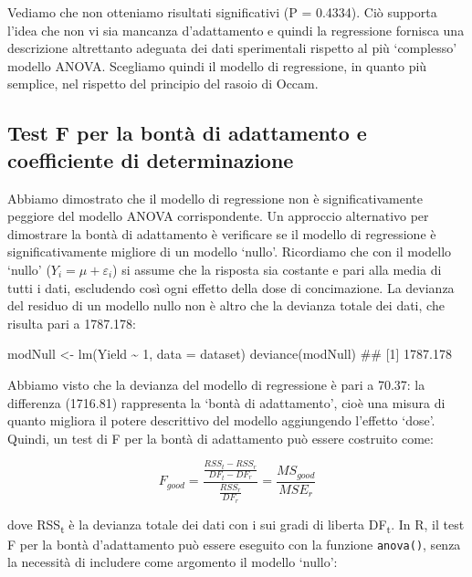 \documentclass[a4paper,12pt,oneside]{book}
\newenvironment{Shaded}{\begin{snugshade}}{\end{snugshade}}
\newcommand{\DecValTok}[1]{#1}
\newcommand{\SpecialCharTok}[1]{#1}
\newcommand{\DocumentationTok}[1]{#1}
\newcommand{\OtherTok}[1]{#1}
\newcommand{\FunctionTok}[1]{#1}
\newcommand{\AttributeTok}[1]{#1}
\newcommand{\NormalTok}[1]{#1}
\begin{document}
Vediamo che non otteniamo risultati significativi (P = 0.4334). Ciò supporta l'idea che non vi sia mancanza d'adattamento e quindi la regressione fornisca una descrizione altrettanto adeguata dei dati sperimentali rispetto al più `complesso' modello ANOVA. Scegliamo quindi il modello di regressione, in quanto più semplice, nel rispetto del principio del rasoio di Occam.

\hypertarget{test-f-per-la-bontuxe0-di-adattamento-e-coefficiente-di-determinazione}{%
\subsection{Test F per la bontà di adattamento e coefficiente di determinazione}\label{test-f-per-la-bontuxe0-di-adattamento-e-coefficiente-di-determinazione}}

Abbiamo dimostrato che il modello di regressione non è significativamente peggiore del modello ANOVA corrispondente. Un approccio alternativo per dimostrare la bontà di adattamento è verificare se il modello di regressione è significativamente migliore di un modello `nullo'. Ricordiamo che con il modello `nullo' (\(Y_i = \mu + \varepsilon_i\)) si assume che la risposta sia costante e pari alla media di tutti i dati, escludendo così ogni effetto della dose di concimazione. La devianza del residuo di un modello nullo non è altro che la devianza totale dei dati, che risulta pari a 1787.178:

\begin{Shaded}
\begin{Highlighting}[]
\NormalTok{modNull }\OtherTok{\textless{}{-}} \FunctionTok{lm}\NormalTok{(Yield }\SpecialCharTok{\textasciitilde{}} \DecValTok{1}\NormalTok{, }\AttributeTok{data =}\NormalTok{ dataset)}
\FunctionTok{deviance}\NormalTok{(modNull)}
\DocumentationTok{\#\# [1] 1787.178}
\end{Highlighting}
\end{Shaded}

Abbiamo visto che la devianza del modello di regressione è pari a 70.37: la differenza (1716.81) rappresenta la `bontà di adattamento', cioè una misura di quanto migliora il potere descrittivo del modello aggiungendo l'effetto `dose'. Quindi, un test di F per la bontà di adattamento può essere costruito come:

\[ F_{good} = \frac{\frac{RSS_t - RSS_r}{DF_t - DF_r} } {\frac{RSS_r}{DF_r}} = \frac{MS_{good}}{MSE_r}\]

dove RSS\textsubscript{t} è la devianza totale dei dati con i sui gradi di liberta DF\textsubscript{t}. In R, il test F per la bontà d'adattamento può essere eseguito con la funzione \texttt{anova()}, senza la necessità di includere come argomento il modello `nullo':
\end{document}
